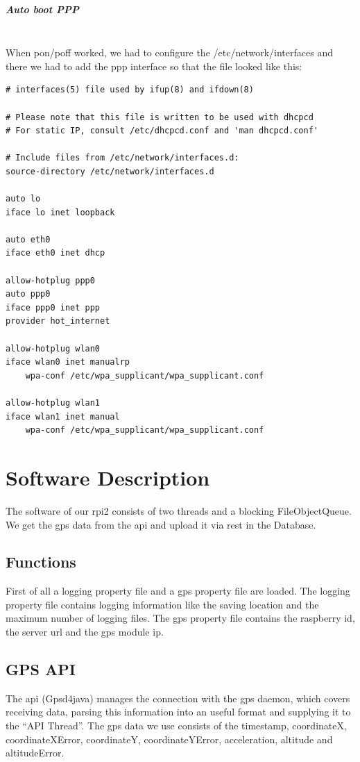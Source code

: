 \subparagraph{Auto boot PPP}\mbox{}\\
When pon/poff worked, we had to configure the /etc/network/interfaces and there we had to add the ppp interface so that the file looked like this:
\begin{verbatim}
# interfaces(5) file used by ifup(8) and ifdown(8)
 
# Please note that this file is written to be used with dhcpcd
# For static IP, consult /etc/dhcpcd.conf and 'man dhcpcd.conf'
 
# Include files from /etc/network/interfaces.d:
source-directory /etc/network/interfaces.d
 
auto lo
iface lo inet loopback
 
auto eth0
iface eth0 inet dhcp
 
allow-hotplug ppp0
auto ppp0
iface ppp0 inet ppp
provider hot_internet
 
allow-hotplug wlan0
iface wlan0 inet manualrp
    wpa-conf /etc/wpa_supplicant/wpa_supplicant.conf
 
allow-hotplug wlan1
iface wlan1 inet manual
    wpa-conf /etc/wpa_supplicant/wpa_supplicant.conf
\end{verbatim}

\newpage
\section{Software Description}
The software of our \gls{rpi2} consists of two threads and a blocking FileObjectQueue. We get the \gls{gps} data from the \gls{api} and upload it via \gls{rest} in the Database. 
\subsection{Functions}
First of all a logging property file and a gps property file are loaded. The logging property file contains logging information like the saving location and the maximum number of logging files. The gps property file contains the raspberry id, the server \gls{url} and the gps module \gls{ip}.
\subsection{GPS API}
The \gls{api} (Gpsd4java) manages the connection with the \gls{gps} daemon, which covers receiving data, parsing this information into an useful format and supplying it to the “API Thread”. The \gls{gps} data we use consists of the timestamp, coordinateX, coordinateXError, coordinateY, coordinateYError, acceleration, altitude and altitudeError.
